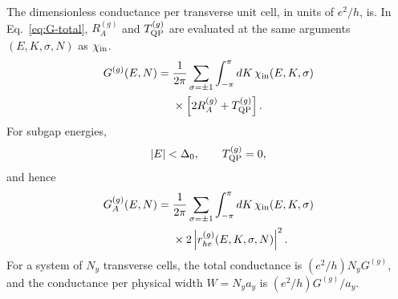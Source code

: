 The dimensionless conductance per transverse unit cell, in units of $e^2/h$, is.  In Eq.~\eqref{eq:G-total}, $R_A^{(g)}$ and $T_{\rm QP}^{(g)}$ are evaluated at the same arguments $(E,K,\sigma,N)$ as $\chi_{\rm in}$.
\begin{equation}
\begin{split}
    G^{(g)}(E,N)
    ={}&
    \frac{1}{2\pi}
    \sum_{\sigma=\pm1}
    \int_{-\pi}^{\pi}dK\,
    \chi_{\rm in}(E,K,\sigma)
    \\
    &\times
    \left[2R_A^{(g)}+T_{\rm QP}^{(g)}\right] .
\end{split}
    \label{eq:G-total}
\end{equation}
For subgap energies,
\begin{equation}
    |E|<\Delta_0,
    \qquad
    T_{\rm QP}^{(g)}=0,
\end{equation}
and hence
\begin{equation}
\begin{split}
    G_A^{(g)}(E,N)
    ={}&
    \frac{1}{2\pi}
    \sum_{\sigma=\pm1}
    \int_{-\pi}^{\pi}dK\,
    \chi_{\rm in}(E,K,\sigma)
    \\
    &\times
    2\left|r_{he}^{(g)}(E,K,\sigma,N)\right|^2 .
\end{split}
    \label{eq:GA-subgap}
\end{equation}
For a system of $N_y$ transverse cells, the total conductance is $(e^2/h)N_yG^{(g)}$, and the conductance per physical width $W=N_y a_y$ is $(e^2/h)G^{(g)}/a_y$.
